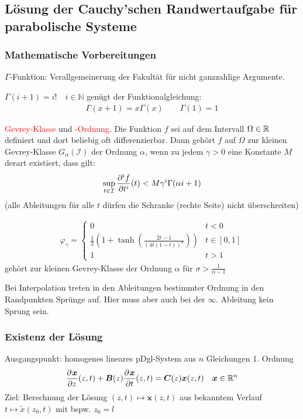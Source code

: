 \newpage
\subsection{Lösung der Cauchy'schen Randwertaufgabe für parabolische Systeme}
\subsubsection{Mathematische Vorbereitungen}
$\Gamma$-Funktion: Verallgemeinerung der Fakultät für nicht ganzzahlige Argumente.

$\Gamma(i+1)=i! \quad i \in \mathbb{N}$ genügt der Funktionalgleichung:
\begin{align*}
\Gamma(x+1)=x\Gamma(x) \qquad \Gamma(1)=1
\end{align*}
\begin{defi} \textcolor{red}{Gevrey-Klasse} und \textcolor{red}{-Ordnung}. Die Funktion $f$ sei auf dem Intervall $\Omega \in \R$ definiert und dort beliebig oft differenzierbar. Dann gehört $f$ auf $\Omega$ zur kleinen Gevrey-Klasse $G_\alpha(\mathcal{I})$ der Ordnung $\alpha$, wenn zu jedem $\gamma>0$ eine Konstante $M$ derart existiert, dass gilt:
\begin{align*}
\sup_{t\in\mathcal{I}}{\pd[i]{f}{t^i}(t)<M\gamma^i\Gamma(\alpha i+1)}
\end{align*}
(alle Ableitungen für alle $t$ dürfen die Schranke (rechte Seite) nicht überschreiten)
\end{defi}
\begin{bsp}
\begin{align*}
\varphi_\gamma =  \begin{cases}0 & t<0 \\ \frac{1}{2}\left(1+\tanh\left(\frac{2t-1}{(4t(1-t))^\sigma}\right)\right) & t \in[0,1] \\1 &t>1 \end{cases}
\end{align*}
gehört zur kleinen Gevrey-Klasse der Ordnung $\alpha$ für $\sigma>\frac{1}{\alpha-1}$

Bei Interpolation treten in den Ableitungen bestimmter Ordnung in den Randpunkten Sprünge auf. Hier muss aber auch bei der $\infty.$ Ableitung kein Sprung sein.
\end{bsp}
\subsubsection{Existenz der Lösung}
Ausgangspunkt: homogenes lineares pDgl-System aus $n$ Gleichungen 1. Ordnung
\begin{align}
\pd{\bm{x}}{z}(z,t)+\bm{B}(z)\pd{\bm{x}}{t}(z,t) = \bm{C}(z)\bm{x}(z,t)  \quad \bm{x} \in \R^n \label{eq:4-11}
\end{align}
Ziel: Berechnung der Lösung $(z,t)\mapsto\bm{x}(z,t)$ aus bekanntem Verlauf $t\mapsto \tilde{x}(z_0,t)$ mit bspw. $z_0=l$

